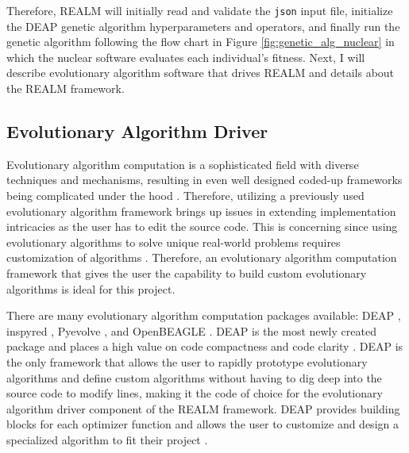 Therefore, \gls{REALM} will initially read and validate the \texttt{json} input 
file, initialize the \gls{DEAP} genetic algorithm hyperparameters and operators, 
and finally run the genetic algorithm following the flow chart in Figure 
\ref{fig:genetic_alg_nuclear} in which the nuclear software evaluates each 
individual's fitness. 
Next, I will describe evolutionary algorithm software that drives \gls{REALM} 
and details about the \gls{REALM} framework. 

\subsection{Evolutionary Algorithm Driver}
Evolutionary algorithm computation is a sophisticated field with diverse techniques 
and mechanisms, resulting in even well designed coded-up frameworks being complicated 
under the hood \cite{fortin_deap_2012}. 
Therefore, utilizing a previously used evolutionary algorithm framework brings 
up issues in extending implementation intricacies as the user has to edit the 
source code. 
This is concerning since using evolutionary algorithms to solve unique real-world 
problems requires customization of algorithms \cite{fortin_deap_2012}. 
Therefore, an evolutionary algorithm computation framework that gives the user the 
capability to build custom evolutionary algorithms is ideal for this project.

There are many evolutionary algorithm computation packages available: 
\gls{DEAP} \cite{fortin_deap_2012}, inspyred \cite{garrett_inspyred_2014}, 
Pyevolve \cite{perone_pyevolve_2009}, and OpenBEAGLE \cite{gagne_open_2002}.
\gls{DEAP} is the most newly created package and places a high value on code 
compactness and code clarity \cite{fortin_deap_2012}. 
\gls{DEAP} is the only framework that allows the user to rapidly prototype 
evolutionary algorithms and define custom algorithms without having to dig 
deep into the source code to modify lines,  making it the code of choice for 
the evolutionary algorithm driver component of the \gls{REALM} framework.  
\gls{DEAP} provides building blocks for each optimizer function and allows the 
user to customize and design a specialized algorithm to fit their project
\cite{fortin_deap_2012}.

